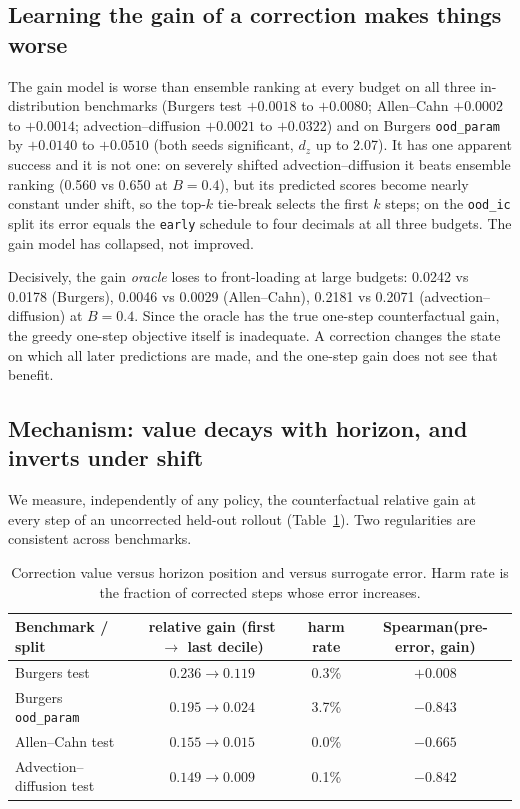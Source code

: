 \documentclass[11pt]{article}
\begin{document}
\subsection{Learning the gain of a correction makes things worse}
\label{sec:gain}

The gain model is worse than ensemble ranking at every budget on all three
in-distribution benchmarks (Burgers test $+0.0018$ to $+0.0080$; Allen--Cahn
$+0.0002$ to $+0.0014$; advection--diffusion $+0.0021$ to $+0.0322$) and on
Burgers \texttt{ood\_param} by $+0.0140$ to $+0.0510$ (both seeds significant,
$d_z$ up to 2.07). It has one apparent success and it is not one: on severely
shifted advection--diffusion it beats ensemble ranking (0.560 vs 0.650 at
$B=0.4$), but its predicted scores become nearly constant under shift, so the
top-$k$ tie-break selects the first $k$ steps; on the
\texttt{ood\_ic} split its error equals the \texttt{early} schedule to four
decimals at all three budgets. The gain
model has collapsed, not improved.

Decisively, the gain \emph{oracle} loses to front-loading at large budgets:
0.0242 vs 0.0178 (Burgers), 0.0046 vs 0.0029 (Allen--Cahn), 0.2181 vs 0.2071
(advection--diffusion) at $B=0.4$. Since the oracle has the true one-step
counterfactual gain, the greedy one-step objective itself is inadequate. A
correction changes the state on which all later predictions are made, and the
one-step gain does not see that benefit.

\subsection{Mechanism: value decays with horizon, and inverts under shift}
\label{sec:mechanism}

We measure, independently of any policy, the counterfactual relative gain at
every step of an uncorrected held-out rollout
(Table~\ref{tab:decay}). Two regularities are consistent across benchmarks.

\begin{table}[t]
\centering
\small
\begin{tabular}{lccc}
\toprule
Benchmark / split & relative gain (first $\to$ last decile) & harm rate & Spearman(pre-error, gain) \\
\midrule
Burgers test & $0.236\to0.119$ & 0.3\% & $+0.008$ \\
Burgers \texttt{ood\_param} & $0.195\to0.024$ & 3.7\% & $-0.843$ \\
Allen--Cahn test & $0.155\to0.015$ & 0.0\% & $-0.665$ \\
Advection--diffusion test & $0.149\to0.009$ & 0.1\% & $-0.842$ \\
\bottomrule
\end{tabular}
\caption{Correction value versus horizon position and versus surrogate error.
Harm rate is the fraction of corrected steps whose error increases.}
\label{tab:decay}
\end{table}
\end{document}
